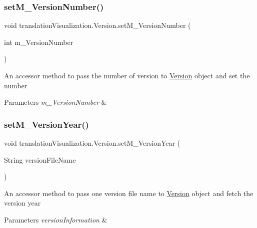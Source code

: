 \subsubsection{\texorpdfstring{set\+M\+\_\+\+Version\+Number()}{setM\_VersionNumber()}}
{\footnotesize\ttfamily void translation\+Visualization.\+Version.\+set\+M\+\_\+\+Version\+Number (\begin{DoxyParamCaption}\item[{int}]{m\+\_\+\+Version\+Number }\end{DoxyParamCaption})\hspace{0.3cm}{\ttfamily [inline]}}

An accessor method to pass the number of version to \hyperlink{classtranslation_visualization_1_1_version}{Version} object and set the number 
\begin{DoxyParams}{Parameters}
{\em m\+\_\+\+Version\+Number} & \\
\hline
\end{DoxyParams}
\mbox{\label{classtranslation_visualization_1_1_version_a4151be9b0ec9b16a26c2a9ccfc49c69b}} 
\subsubsection{\texorpdfstring{set\+M\+\_\+\+Version\+Year()}{setM\_VersionYear()}}
{\footnotesize\ttfamily void translation\+Visualization.\+Version.\+set\+M\+\_\+\+Version\+Year (\begin{DoxyParamCaption}\item[{String}]{version\+File\+Name }\end{DoxyParamCaption})\hspace{0.3cm}{\ttfamily [inline]}}

An accessor method to pass one version file name to \hyperlink{classtranslation_visualization_1_1_version}{Version} object and fetch the version year 
\begin{DoxyParams}{Parameters}
{\em version\+Information} & \\
\hline
\end{DoxyParams}
\mbox{\label{classtranslation_visualization_1_1_version_a8c41aeab41d000da67ec2cae090cc105}} 

